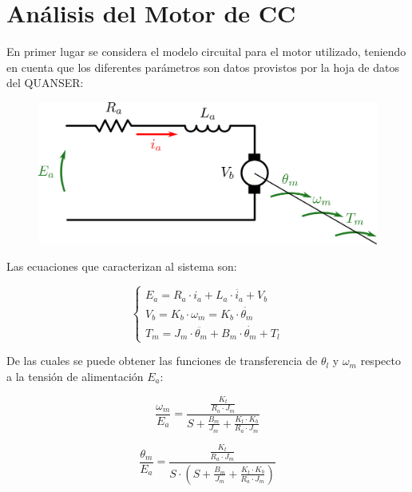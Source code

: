 \documentclass{article}
\begin{document}



\tableofcontents
\newpage

\section{Análisis del Motor de CC}

En primer lugar se considera el modelo circuital para el motor utilizado, teniendo en cuenta que los diferentes parámetros son datos provistos por la hoja de datos del QUANSER:

\begin{figure}[H]
\centering
\includegraphics[width=0.5\linewidth]{../Images/ModeloMotor.png}
\end{figure}

Las ecuaciones que caracterizan al sistema son:

\[
\left\lbrace
\begin{array}{ll}
E_a = R_a \cdot i_a + L_a \cdot \dot{i_a} + V_b \\
V_b = K_b \cdot \omega_m = K_b \cdot \dot{\theta_m} \\
T_m = J_m \cdot \ddot{\theta_m} + B_m \cdot \dot{\theta_m} + T_l
\end{array}
\right.
\]

De las cuales se puede obtener las funciones de transferencia de $\theta_l$ y $\omega_m$ respecto a la tensión de alimentación $E_a$:

\[
\frac{\omega_m}{E_a} = \frac{\frac{K_t}{R_a \cdot J_m}}{S + \frac{B_m}{J_m} + \frac{K_t \cdot K_b}{R_a \cdot J_m}}
\]

\[
\frac{\theta_m}{E_a} = \frac{\frac{K_t}{R_a \cdot J_m}}{S \cdot (S + \frac{B_m}{J_m} + \frac{K_t \cdot K_b}{R_a \cdot J_m})}
\]
\end{document}
